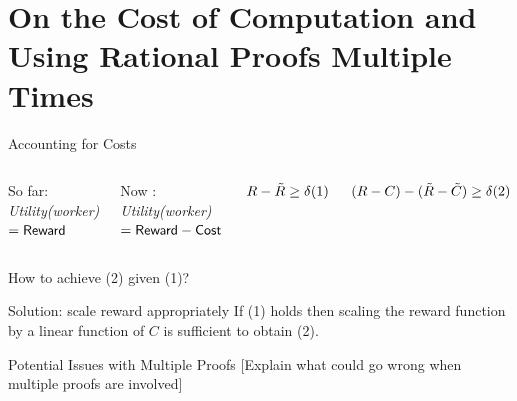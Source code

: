 \section{On the Cost of Computation and Using Rational Proofs Multiple Times}

\begin{frame}{Accounting for Costs}
	\begin{columns}
	\begin{block}{So far:}
		\textit{Utility(worker)} $ = \mathsf{Reward}$
	\end{block}
	\begin{block}{Now :}
		\textit{Utility(worker)} $= \mathsf{Reward} - \mathsf{Cost}$
	\end{block}
	\begin{block}{}
		$R - \tilde{R} \geq \delta \hspace*{\fill} (1) \hspace*{\fill}$
	\end{block}
	\begin{block}{}
		$(R-C) - (\tilde{R}-\tilde{C}) \geq \delta \hspace*{\fill} (2) \hspace*{\fill}$			
	\end{block}
	\end{columns}
	\bigskip
\begin{block}{How to achieve (2) given (1)?}
\end{block}
	\begin{block}{Solution: scale reward appropriately}
		If (1) holds then scaling the reward function by a linear function of $C$ is sufficient to obtain (2).
	\end{block}
\end{frame}

\begin{frame}{Potential Issues with Multiple Proofs}
[Explain what could go wrong when multiple proofs are involved]
\end{frame}

